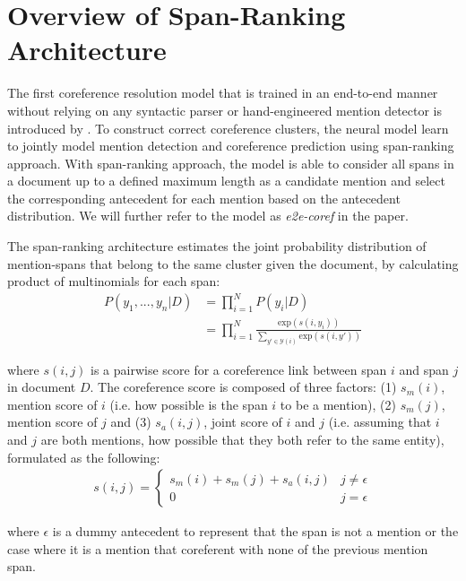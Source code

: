 \documentclass[11pt]{article}
\begin{document}

\section{Overview of Span-Ranking Architecture}
The first coreference resolution model that is trained in an end-to-end manner without relying on any syntactic parser or hand-engineered mention detector is introduced by \parencite{lee2017end}. To construct correct coreference clusters, the neural model learn to jointly model mention detection and coreference prediction using span-ranking approach.  With span-ranking approach, the model is able to consider all spans in a document up to a defined maximum length as a candidate mention and select the corresponding antecedent for each mention based on the antecedent distribution. We will further refer to the model as \textit{e2e-coref} in the paper.

The span-ranking architecture estimates the joint probability distribution of mention-spans that belong to the same cluster given the document, by calculating product of multinomials for each span:
\begin{align}
P(y_{1}, ..., y_{n}|D) &= \prod\limits_{i=1}^{N} P(y_{i}|D) \\
&= \prod\limits_{i=1}^{N} \frac{\text{exp}(s(i, y_{i}))}{\sum_{y' \in \mathcal{Y}(i)} \text{exp}(s(i, y'))}
\end{align}

where $s(i,j)$ is a pairwise score for a coreference link between span $i$ and span $j$ in document $D$. The coreference score is composed of three factors: (1) $s_{m}(i)$, mention score of $i$ (i.e. how possible is the span $i$ to be a mention), (2) $s_{m}(j)$, mention score of $j$ and (3) $s_{a}(i,j)$, joint score of $i$ and $j$ (i.e. assuming that $i$ and $j$ are both mentions, how possible that they both refer to the same entity), formulated as the following:
\begin{align}
s(i, j) = \begin{cases}
s_{m}(i) + s_{m}(j) + s_{a}(i, j) & j \neq \epsilon \\
0 & j = \epsilon
\end{cases}
\end{align} 

where $\epsilon$ is a dummy antecedent to represent that the span is not a mention or the case where it is a mention that coreferent with none of the previous mention span.
\end{document}
